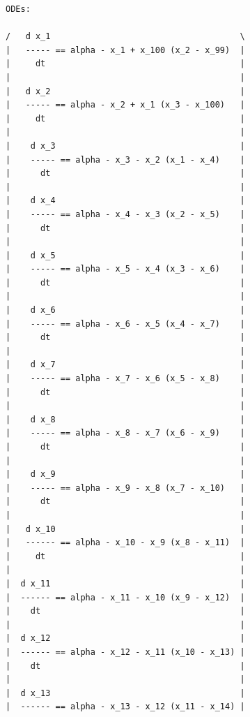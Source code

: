 {\centering\small
        \color{MidnightBlue} \begin{verbatim} 
ODEs:
 
/   d x_1                                      \
|   ----- == alpha - x_1 + x_100 (x_2 - x_99)  |
|     dt                                       |
|                                              |
|   d x_2                                      |
|   ----- == alpha - x_2 + x_1 (x_3 - x_100)   |
|     dt                                       |
|                                              |
|    d x_3                                     |
|    ----- == alpha - x_3 - x_2 (x_1 - x_4)    |
|      dt                                      |
|                                              |
|    d x_4                                     |
|    ----- == alpha - x_4 - x_3 (x_2 - x_5)    |
|      dt                                      |
|                                              |
|    d x_5                                     |
|    ----- == alpha - x_5 - x_4 (x_3 - x_6)    |
|      dt                                      |
|                                              |
|    d x_6                                     |
|    ----- == alpha - x_6 - x_5 (x_4 - x_7)    |
|      dt                                      |
|                                              |
|    d x_7                                     |
|    ----- == alpha - x_7 - x_6 (x_5 - x_8)    |
|      dt                                      |
|                                              |
|    d x_8                                     |
|    ----- == alpha - x_8 - x_7 (x_6 - x_9)    |
|      dt                                      |
|                                              |
|    d x_9                                     |
|    ----- == alpha - x_9 - x_8 (x_7 - x_10)   |
|      dt                                      |
|                                              |
|   d x_10                                     |
|   ------ == alpha - x_10 - x_9 (x_8 - x_11)  |
|     dt                                       |
|                                              |
|  d x_11                                      |
|  ------ == alpha - x_11 - x_10 (x_9 - x_12)  |
|    dt                                        |
|                                              |
|  d x_12                                      |
|  ------ == alpha - x_12 - x_11 (x_10 - x_13) |
|    dt                                        |
|                                              |
|  d x_13                                      |
|  ------ == alpha - x_13 - x_12 (x_11 - x_14) |

\end{verbatim}}
